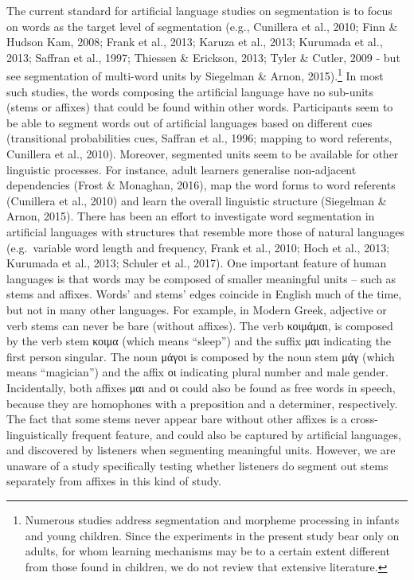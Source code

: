 \documentclass[
  american,
  ,man,floatsintext]{apa6}
\begin{document}
The current standard for artificial language studies on segmentation is to focus on words as the target level of segmentation (e.g., Cunillera et al., 2010; Finn \& Hudson Kam, 2008; Frank et al., 2013; Karuza et al., 2013; Kurumada et al., 2013; Saffran et al., 1997; Thiessen \& Erickson, 2013; Tyler \& Cutler, 2009 - but see segmentation of multi-word units by Siegelman \& Arnon, 2015).\footnote{Numerous studies address segmentation and morpheme processing in infants and young children. Since the experiments in the present study bear only on adults, for whom learning mechanisms may be to a certain extent different from those found in children, we do not review that extensive literature.} In most such studies, the words composing the artificial language have no sub-units (stems or affixes) that could be found within other words. Participants seem to be able to segment words out of artificial languages based on different cues (transitional probabilities cues, Saffran et al., 1996; mapping to word referents, Cunillera et al., 2010). Moreover, segmented units seem to be available for other linguistic processes. For instance, adult learners generalise non-adjacent dependencies (Frost \& Monaghan, 2016), map the word forms to word referents (Cunillera et al., 2010) and learn the overall linguistic structure (Siegelman \& Arnon, 2015). There has been an effort to investigate word segmentation in artificial languages with structures that resemble more those of natural languages (e.g.~variable word length and frequency, Frank et al., 2010; Hoch et al., 2013; Kurumada et al., 2013; Schuler et al., 2017). One important feature of human languages is that words may be composed of smaller meaningful units -- such as stems and affixes. Words' and stems' edges coincide in English much of the time, but not in many other languages. For example, in Modern Greek, adjective or verb stems can never be bare (without affixes). The verb κοιμάμαι, is composed by the verb stem κοιμα (which means ``sleep'') and the suffix μαι indicating the first person singular. The noun μάγοι is composed by the noun stem μάγ (which means ``magician'') and the affix οι indicating plural number and male gender. Incidentally, both affixes μαι and οι could also be found as free words in speech, because they are homophones with a preposition and a determiner, respectively. The fact that some stems never appear bare without other affixes is a cross-linguistically frequent feature, and could also be captured by artificial languages, and discovered by listeners when segmenting meaningful units. However, we are unaware of a study specifically testing whether listeners do segment out stems separately from affixes in this kind of study.
\end{document}

